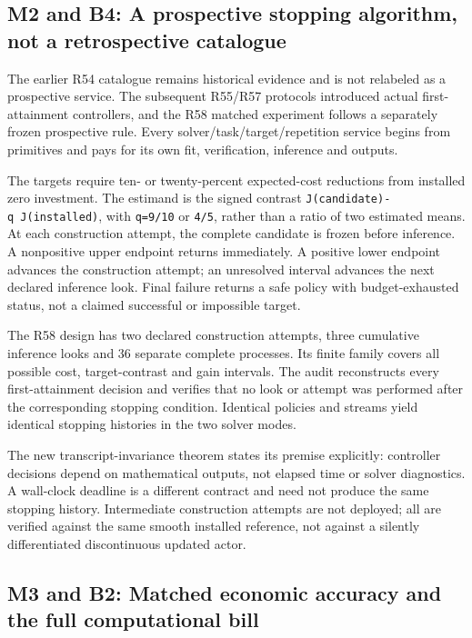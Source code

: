 \hypertarget{m2-and-b4-a-prospective-stopping-algorithm-not-a-retrospective-catalogue}{%
\subsection{M2 and B4: A prospective stopping algorithm, not a
retrospective
catalogue}\label{m2-and-b4-a-prospective-stopping-algorithm-not-a-retrospective-catalogue}}

The earlier R54 catalogue remains historical evidence and is not
relabeled as a prospective service. The subsequent R55/R57 protocols
introduced actual first-attainment controllers, and the R58 matched
experiment follows a separately frozen prospective rule. Every
solver/task/target/repetition service begins from primitives and pays
for its own fit, verification, inference and outputs.

The targets require ten- or twenty-percent expected-cost reductions from
installed zero investment. The estimand is the signed contrast
\texttt{J(candidate)-q\ J(installed)}, with \texttt{q=9/10} or
\texttt{4/5}, rather than a ratio of two estimated means. At each
construction attempt, the complete candidate is frozen before inference.
A nonpositive upper endpoint returns immediately. A positive lower
endpoint advances the construction attempt; an unresolved interval
advances the next declared inference look. Final failure returns a safe
policy with budget-exhausted status, not a claimed successful or
impossible target.

The R58 design has two declared construction attempts, three cumulative
inference looks and 36 separate complete processes. Its finite family
covers all possible cost, target-contrast and gain intervals. The audit
reconstructs every first-attainment decision and verifies that no look
or attempt was performed after the corresponding stopping condition.
Identical policies and streams yield identical stopping histories in the
two solver modes.

The new transcript-invariance theorem states its premise explicitly:
controller decisions depend on mathematical outputs, not elapsed time or
solver diagnostics. A wall-clock deadline is a different contract and
need not produce the same stopping history. Intermediate construction
attempts are not deployed; all are verified against the same smooth
installed reference, not against a silently differentiated discontinuous
updated actor.

\hypertarget{m3-and-b2-matched-economic-accuracy-and-the-full-computational-bill}{%
\subsection{M3 and B2: Matched economic accuracy and the full
computational
bill}\label{m3-and-b2-matched-economic-accuracy-and-the-full-computational-bill}}

